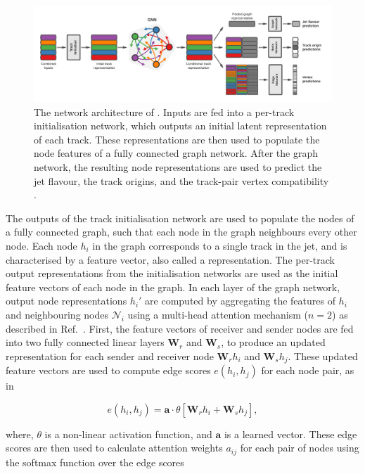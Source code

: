 \begin{figure}[!htbp]
    \centering
    \includegraphics[width=\textwidth]{chapters/gnn_tagger/figs/full_arch.pdf}
    \caption{The network architecture of \GNN. Inputs are fed into a per-track initialisation network, which outputs an initial latent representation of each track. These representations are then used to populate the node features of a fully connected graph network. After the graph network, the resulting node representations are used to predict the jet flavour, the track origins, and the track-pair vertex compatibility \cite{ATL-PHYS-PUB-2022-027}.}
    \label{fig:new_arch}
\end{figure}

The outputs of the track initialisation network are used to populate the nodes of a fully connected graph, such that each node in the graph neighbours every other node.
Each node $h_i$ in the graph corresponds to a single track in the jet, and is characterised by a feature vector, also called a representation.
The per-track output representations from the initialisation networks are used as the initial feature vectors of each node in the graph.
In each layer of the graph network, output node representations $h_i'$ are computed by aggregating the features of $h_i$ and neighbouring nodes $\mathcal{N}_i$ using a multi-head attention mechanism ($n=2$) as described in Ref.~\cite{2021arXiv210514491B,2017arXiv170603762V}.
First, the feature vectors of receiver and sender nodes are fed into two fully connected linear layers $\mathbf{W}_r$ and $\mathbf{W}_s$, to produce an updated representation for each sender and receiver node $\mathbf{W}_r h_i$ and $\mathbf{W}_s h_j$.
These updated feature vectors are used to compute edge scores $e(h_i, h_j)$ for each node pair, as in

\begin{equation}\label{eq:edge_score}
    e(h_i, h_j) = \mathbf{a} \cdot \theta \left[ \mathbf{W}_r h_i + \mathbf{W}_s h_j \right],
\end{equation}

where, $\theta$ is a non-linear activation function, and $\mathbf{a}$ is a learned vector.
These edge scores are then used to calculate attention weights $a_{ij}$ for each pair of nodes using the softmax function over the edge scores

